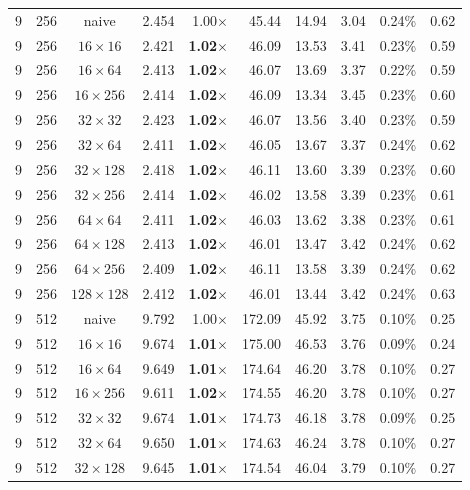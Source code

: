 \documentclass[11pt,a4paper]{article}
\begin{document}
{\begin{longtable}{rrcrrrrrrr}
\midrule
9 & 256 & naive & 2.454 & 1.00$\times$ & 45.44 & 14.94 & 3.04 & 0.24\% & 0.62 \\
9 & 256 & $16\times 16$ & 2.421 & \textbf{1.02$\times$} & 46.09 & 13.53 & 3.41 & 0.23\% & 0.59 \\
9 & 256 & $16\times 64$ & 2.413 & \textbf{1.02$\times$} & 46.07 & 13.69 & 3.37 & 0.22\% & 0.59 \\
9 & 256 & $16\times 256$ & 2.414 & \textbf{1.02$\times$} & 46.09 & 13.34 & 3.45 & 0.23\% & 0.60 \\
9 & 256 & $32\times 32$ & 2.423 & \textbf{1.02$\times$} & 46.07 & 13.56 & 3.40 & 0.23\% & 0.59 \\
9 & 256 & $32\times 64$ & 2.411 & \textbf{1.02$\times$} & 46.05 & 13.67 & 3.37 & 0.24\% & 0.62 \\
9 & 256 & $32\times 128$ & 2.418 & \textbf{1.02$\times$} & 46.11 & 13.60 & 3.39 & 0.23\% & 0.60 \\
9 & 256 & $32\times 256$ & 2.414 & \textbf{1.02$\times$} & 46.02 & 13.58 & 3.39 & 0.23\% & 0.61 \\
9 & 256 & $64\times 64$ & 2.411 & \textbf{1.02$\times$} & 46.03 & 13.62 & 3.38 & 0.23\% & 0.61 \\
9 & 256 & $64\times 128$ & 2.413 & \textbf{1.02$\times$} & 46.01 & 13.47 & 3.42 & 0.24\% & 0.62 \\
9 & 256 & $64\times 256$ & 2.409 & \textbf{1.02$\times$} & 46.11 & 13.58 & 3.39 & 0.24\% & 0.62 \\
9 & 256 & $128\times 128$ & 2.412 & \textbf{1.02$\times$} & 46.01 & 13.44 & 3.42 & 0.24\% & 0.63 \\
\midrule
9 & 512 & naive & 9.792 & 1.00$\times$ & 172.09 & 45.92 & 3.75 & 0.10\% & 0.25 \\
9 & 512 & $16\times 16$ & 9.674 & \textbf{1.01$\times$} & 175.00 & 46.53 & 3.76 & 0.09\% & 0.24 \\
9 & 512 & $16\times 64$ & 9.649 & \textbf{1.01$\times$} & 174.64 & 46.20 & 3.78 & 0.10\% & 0.27 \\
9 & 512 & $16\times 256$ & 9.611 & \textbf{1.02$\times$} & 174.55 & 46.20 & 3.78 & 0.10\% & 0.27 \\
9 & 512 & $32\times 32$ & 9.674 & \textbf{1.01$\times$} & 174.73 & 46.18 & 3.78 & 0.09\% & 0.25 \\
9 & 512 & $32\times 64$ & 9.650 & \textbf{1.01$\times$} & 174.63 & 46.24 & 3.78 & 0.10\% & 0.27 \\
9 & 512 & $32\times 128$ & 9.645 & \textbf{1.01$\times$} & 174.54 & 46.04 & 3.79 & 0.10\% & 0.27 \\

\end{longtable}}
\end{document}
